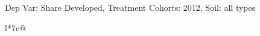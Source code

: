 \begin{table}[H]
\captionlistentry[table]{}
\label{table:beaver_land_class_DVis_land_class_3_SCg1_SSall_soil}
\scriptsize %
Dep Var: Share Developed, Treatment Cohorts: 2012, Soil: all types \\
\begin{threeparttable}
\begin{tabulary}{\textwidth}{l*{7}{c}@{}}
\toprule \toprule
\noalign{\smallskip}
\noalign{\smallskip}
\midrule \bottomrule
\end{tabulary}
\medskip
\end{threeparttable}
\end{table}
